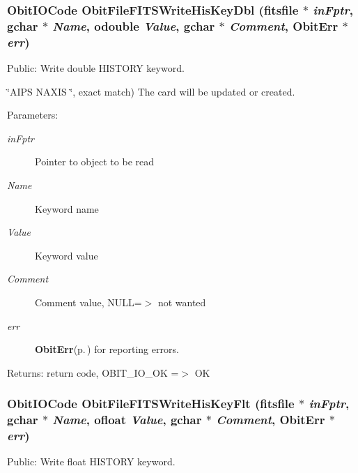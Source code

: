 \subsubsection{\setlength{\rightskip}{0pt plus 5cm}Obit\-IOCode Obit\-File\-FITSWrite\-His\-Key\-Dbl (fitsfile $\ast$ {\em in\-Fptr}, gchar $\ast$ {\em Name}, {\bf odouble} {\em Value}, gchar $\ast$ {\em Comment}, {\bf Obit\-Err} $\ast$ {\em err})}\label{ObitFileFITS_8c_a31}


Public: Write double HISTORY keyword. 

\char`\"{}AIPS   NAXIS   \char`\"{}, exact match) The card will be updated or created. \begin{Desc}
\item[Parameters:]
\begin{description}
\item[{\em in\-Fptr}]Pointer to object to be read \item[{\em Name}]Keyword name \item[{\em Value}]Keyword value \item[{\em Comment}]Comment value, NULL=$>$ not wanted \item[{\em err}]{\bf Obit\-Err}{\rm (p.\,\pageref{structObitErr})} for reporting errors. \end{description}
\end{Desc}
\begin{Desc}
\item[Returns:]return code, OBIT\_\-IO\_\-OK =$>$ OK \end{Desc}
\subsubsection{\setlength{\rightskip}{0pt plus 5cm}Obit\-IOCode Obit\-File\-FITSWrite\-His\-Key\-Flt (fitsfile $\ast$ {\em in\-Fptr}, gchar $\ast$ {\em Name}, {\bf ofloat} {\em Value}, gchar $\ast$ {\em Comment}, {\bf Obit\-Err} $\ast$ {\em err})}\label{ObitFileFITS_8c_a30}


Public: Write float HISTORY keyword. 

